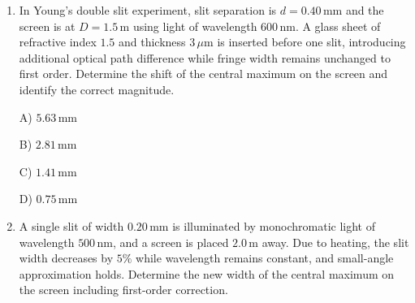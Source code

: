\documentclass[12pt]{article}
\begin{document}
\begin{enumerate}[leftmargin=*]

 



\item In Young’s double slit experiment, slit separation is \(d=0.40\,\text{mm}\) and the screen is at \(D=1.5\,\text{m}\) using light of wavelength \(600\,\text{nm}\). A glass sheet of refractive index \(1.5\) and thickness \(3\,\mu\text{m}\) is inserted before one slit, introducing additional optical path difference while fringe width remains unchanged to first order. Determine the shift of the central maximum on the screen and identify the correct magnitude.  

\begin{center}
\end{center}

A) \(5.63\,\text{mm}\)  

B) \(2.81\,\text{mm}\)  

C) \(1.41\,\text{mm}\)  

D) \(0.75\,\text{mm}\)  


\item A single slit of width \(0.20\,\text{mm}\) is illuminated by monochromatic light of wavelength \(500\,\text{nm}\), and a screen is placed \(2.0\,\text{m}\) away. Due to heating, the slit width decreases by \(5\%\) while wavelength remains constant, and small-angle approximation holds. Determine the new width of the central maximum on the screen including first-order correction.  

\begin{center}
\end{center}
\end{enumerate}
\end{document}
